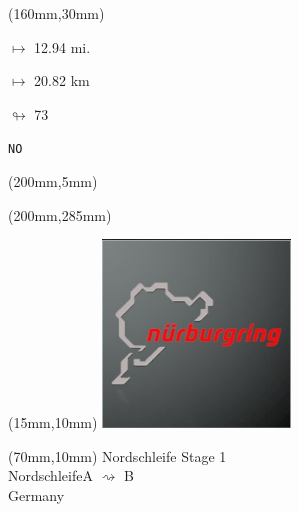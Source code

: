 \begin{textblock*}{40mm}(160mm,30mm)%
\Large
\par$\mapsto$ 12.94 mi.
\par$\mapsto$ 20.82 km
\par$\looparrowright$ 73
\par\hfill\tiny\tt NO\\
\end{textblock*}
\begin{textblock*}{20mm}(200mm,5mm)%
\fbox{\thepage}
\label{NO}
\end{textblock*}
\begin{textblock*}{20mm}(200mm,285mm)%
\fbox{\thepage}
\end{textblock*}

\null\newpage
\begin{textblock*}{50mm}(15mm,10mm)%
\includegraphics[width=50mm]{LG/2015-05-20_00088.png}
\end{textblock*}
\begin{textblock*}{130mm}(70mm,10mm)%
{\fontsize{20}{20}\selectfont Nordschleife Stage 1\\}
{\fontsize{16}{16}\selectfont Nordschleife\hfill A $\rightsquigarrow$ B\\}
{\fontsize{12}{12}\selectfont Germany\\}
\end{textblock*}
